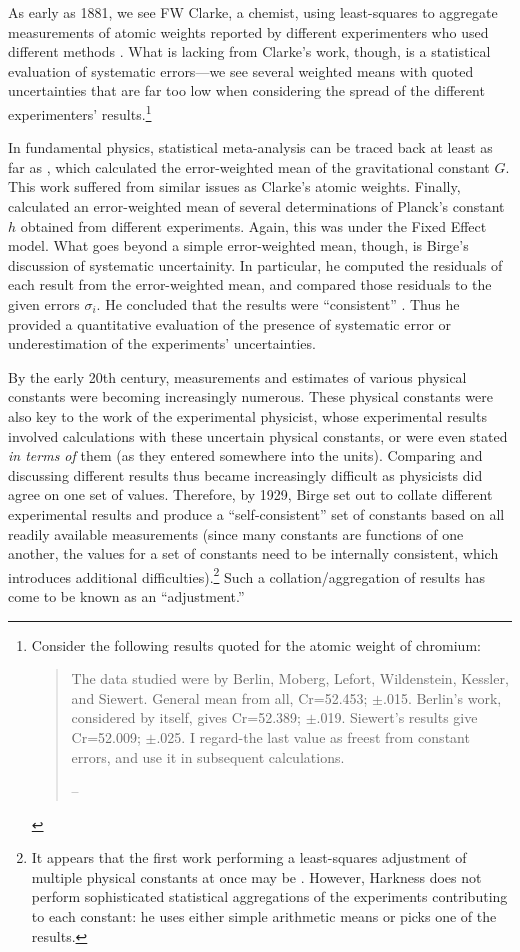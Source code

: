 \documentclass[12pt]{article}
\begin{document}
As early as 1881, we see FW Clarke, a chemist, using least-squares to aggregate measurements of atomic weights reported by different experimenters who used different methods \citep{clarke1881abstract}. What is lacking from Clarke's work, though, is a statistical evaluation of systematic errors---we see several weighted means with quoted uncertainties that are far too low when considering the spread of the different experimenters' results.\footnote{Consider the following results quoted for the atomic weight of chromium:
  \begin{quote}
    The data studied were by Berlin, Moberg, Lefort, Wildenstein, Kessler, and Siewert. General mean from all, Cr=52.453; $\pm$.015. Berlin's work, considered by itself, gives Cr=52.389; $\pm$.019. Siewert's results give Cr=52.009; $\pm$.025. I regard-the last value as freest from constant errors, and use it in subsequent calculations.
  
    \hfill-- \cite{clarke1881abstract}
  \end{quote}
}

In fundamental physics, statistical meta-analysis can be traced back at least as far as \cite{burgess1902value}, which calculated the error-weighted mean of the gravitational constant $G$. This work suffered from similar issues as Clarke's atomic weights. Finally, \cite{birge1919most} calculated an error-weighted mean of several determinations of Planck's constant $h$ obtained from different experiments. Again, this was under the Fixed Effect model. What goes beyond a simple error-weighted mean, though, is Birge's discussion of systematic uncertainity. In particular, he computed the residuals of each result from the error-weighted mean, and compared those residuals to the given errors $\sigma_i$. He concluded that the results were ``consistent'' \cite{birge1919most}. Thus he provided a quantitative evaluation of the presence of systematic error or underestimation of the experiments' uncertainties.

By the early 20th century, measurements and estimates of various physical constants were becoming increasingly numerous. These physical constants were also key to the work of the experimental physicist, whose experimental results involved calculations with these uncertain physical constants, or were even stated \emph{in terms of} them (as they entered somewhere into the units). Comparing and discussing different results thus became increasingly difficult as physicists did agree on one set of values. Therefore, by 1929, Birge set out to collate different experimental results and produce a ``self-consistent'' set of constants based on all readily available measurements (since many constants are functions of one another, the values for a set of constants need to be internally consistent, which introduces additional difficulties).\footnote{It appears that the first work performing a least-squares adjustment of multiple physical constants at once may be \cite{harkness1891solar}. However, Harkness does not perform sophisticated statistical aggregations of the experiments contributing to each constant: he uses either simple arithmetic means or picks one of the results.} Such a collation/aggregation of results has come to be known as an ``adjustment.''
\end{document}
